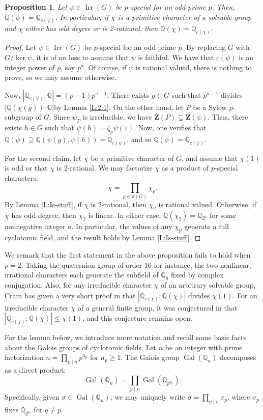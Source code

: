\documentclass[12pt]{amsart}
\newtheorem{proposition}[theorem]{Proposition}
\theoremstyle{definition}
\newcommand{\Q}{\mathbb{Q}}
\DeclareMathOperator{\Gal}{Gal}
\DeclareMathOperator{\Irr}{Irr}
\newcommand{\Cent}{\mathbf{Z}}
\begin{document}
\begin{proposition}\label{P:2:1}
	Let $\psi \in \Irr(G)$ be $p$-special for an odd prime $p$. Then, $\Q(\psi) = \Q_{c(\psi)}$. In particular, if $\chi$ is a primitive character of a solvable group and $\chi$ either has odd degree or is 2-rational, then $\Q(\chi) = \Q_{c(\chi)}$.
\end{proposition}
\begin{proof}
	Let $\psi \in \Irr(G)$ be $p$-special for an odd prime $p$. By replacing $G$ with $G/\ker\psi$, it is of no loss to assume that $\psi$ is faithful. We have that $c(\psi)$ is an integer power of $p$, say $p^a$. Of course, if $\psi$ is rational valued, there is nothing to prove, so we may assume otherwise. 
	
	Now, $|\Q_{c(\psi)} : \Q| = (p-1)p^{a-1}$. There exists $g \in G$ such that $p^{a-1}$ divides $|\Q(\chi(g)) : \Q|$by Lemma \ref{L:2:1}. On the other hand, let $P$ be a Sylow $p$-subgroup of $G$. Since $\psi_P$ is irreducible, we have $\Cent(P) \subseteq \Cent(\psi)$. Thus, there exists $h \in G$ such that $\psi(h) = \zeta_p\psi(1)$. Now, one verifies that $\Q(\psi) \supseteq \Q(\psi(g),\psi(h)) = \Q_{c(\psi)}$, and so $\Q(\psi) = \Q_{c(\psi)}$.
	
	For the second claim, let $\chi$ be a primitive character of $G$, and assume that $\chi(1)$ is odd or that $\chi$ is 2-rational. We may factorize $\chi$ as a product of $p$-special characters:
	$$
		\chi = \prod_{p \in \pi(G)} \chi_p.
	$$
	By Lemma \ref{L:Is-stuff}, if $\chi$ is 2-rational, then $\chi_2$ is rational valued. Otherwise, if $\chi$ has odd degree, then $\chi_2$ is linear. In either case, $\Q(\chi_2) = \Q_{2^a}$ for some nonnegative integer $a$. In particular, the values of any $\chi_p$ generate a full cyclotomic field, and the result holds by Lemma \ref{L:Is-stuff}.
\end{proof}

We remark that the first statement in the above proposition fails to hold when $p = 2$. Taking the quaternion group of order 16 for instance, the two nonlinear, irrational characters each generate the subfield of $\Q_8$ fixed by complex conjugation. Also, for any irreducible character $\chi$ of an arbitrary solvable group, Cram has given a very short proof in \cite{Cram} that $|\Q_{c(\chi)} : \Q(\chi)|$ divides $\chi(1)$. For an irreducible character $\chi$ of a general finite group, it was conjectured in \cite{HT} that $|\Q_{c(\chi)} : \Q(\chi)| \leq \chi(1)$, and this conjecture remains open.

For the lemma below, we introduce more notation and recall some basic facts about the Galois groups of cyclotomic fields. Let $n$ be an integer with prime factorization $n = \prod_{p \mid n} p^{a_p}$ for $a_p \geq 1$. The Galois group $\Gal(\Q_n)$ decomposes as a direct product: $$\Gal(\Q_n) = \prod_{p \mid n} \Gal(\Q_{p^{a_p}}).$$ Specifically, given $\sigma \in \Gal(\Q_n)$, we may uniquely write $\sigma= \prod_{p \mid n}\sigma_p$, where $\sigma_p$ fixes $\Q_{q^{a_q}}$ for $q \neq p$.
\end{document}
